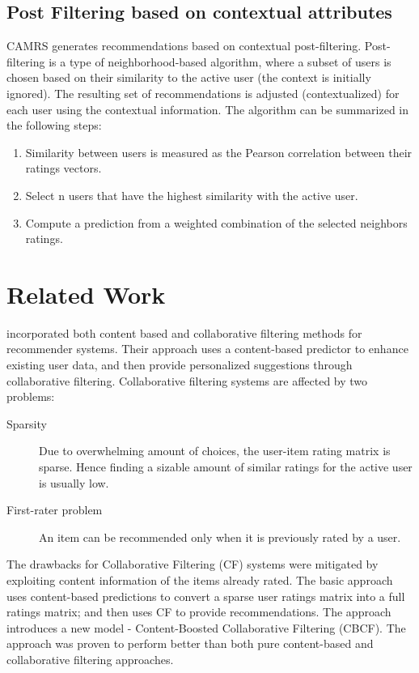 \documentclass{article}
\begin{document}

\subsection{Post Filtering based on contextual attributes}
CAMRS generates recommendations based on contextual post-filtering. Post-filtering is a type of neighborhood-based algorithm, where a subset of users is chosen based on their similarity to the active user (the context is initially ignored). The resulting set of recommendations is adjusted (contextualized) for each user using the contextual information. The algorithm can be summarized in the following steps:
\begin{enumerate}
 \item Similarity between users is measured as the Pearson correlation between their ratings vectors.
 \item Select n users that have the highest similarity with the active user.
 \item Compute a prediction from a weighted combination of the selected neighbors ratings.
\end{enumerate}

\section{Related Work}
\cite{melville2002content} incorporated both content based and collaborative filtering methods for recommender systems. Their approach uses a content-based predictor to enhance existing user data, and then provide personalized suggestions through collaborative filtering. Collaborative filtering systems are affected by two problems:
\begin{description}
\item[Sparsity] Due to overwhelming amount of choices, the user-item rating matrix is sparse. Hence finding a sizable amount of similar ratings for the active user is usually low.\item[First-rater problem] An item can be recommended only when it is previously rated by a user.
\end{description}
The drawbacks for Collaborative Filtering (CF) systems were mitigated by exploiting content information of the items already rated. The basic approach uses content-based predictions to convert a sparse user ratings matrix into a full ratings matrix; and then uses CF to provide recommendations. The approach introduces a new model - Content-Boosted Collaborative Filtering (CBCF). The approach was proven to perform better than both pure content-based and collaborative filtering approaches.
\end{document}
